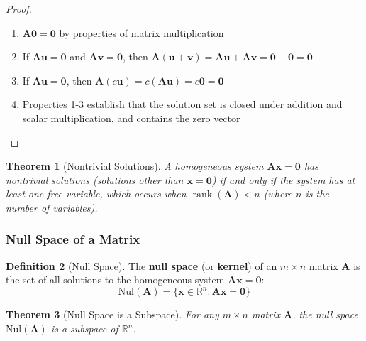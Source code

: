 \documentclass[12pt]{article}
\numberwithin{equation}{section}
\newcommand{\RR}{\mathbb{R}}
\newcommand{\vect}[1]{\boldsymbol{#1}}   %
\newcommand{\mat}[1]{\mathbf{#1}}        %
\newcommand{\rank}{\operatorname{rank}}
\theoremstyle{plain}
\newtheorem{theorem}{Theorem}[section]
\theoremstyle{definition}
\newtheorem{definition}[theorem]{Definition}
\theoremstyle{remark}
\begin{document}
\begin{proof}
\begin{enumerate}
\item $\mat{A}\vect{0} = \vect{0}$ by properties of matrix multiplication
\item If $\mat{A}\vect{u} = \vect{0}$ and $\mat{A}\vect{v} = \vect{0}$, then $\mat{A}(\vect{u} + \vect{v}) = \mat{A}\vect{u} + \mat{A}\vect{v} = \vect{0} + \vect{0} = \vect{0}$
\item If $\mat{A}\vect{u} = \vect{0}$, then $\mat{A}(c\vect{u}) = c(\mat{A}\vect{u}) = c\vect{0} = \vect{0}$
\item Properties 1-3 establish that the solution set is closed under addition and scalar multiplication, and contains the zero vector
\end{enumerate}
\end{proof}

\begin{theorem}[Nontrivial Solutions]
A homogeneous system $\mat{A}\vect{x} = \vect{0}$ has nontrivial solutions (solutions other than $\vect{x} = \vect{0}$) if and only if the system has at least one free variable, which occurs when $\rank(\mat{A}) < n$ (where $n$ is the number of variables).
\end{theorem}

\subsubsection{Null Space of a Matrix}

\begin{definition}[Null Space]
The \textbf{null space} (or \textbf{kernel}) of an $m \times n$ matrix $\mat{A}$ is the set of all solutions to the homogeneous system $\mat{A}\vect{x} = \vect{0}$:
$$\text{Nul}(\mat{A}) = \{\vect{x} \in \RR^n : \mat{A}\vect{x} = \vect{0}\}$$
\end{definition}

\begin{theorem}[Null Space is a Subspace]
For any $m \times n$ matrix $\mat{A}$, the null space $\text{Nul}(\mat{A})$ is a subspace of $\RR^n$.
\end{theorem}
\end{document}
